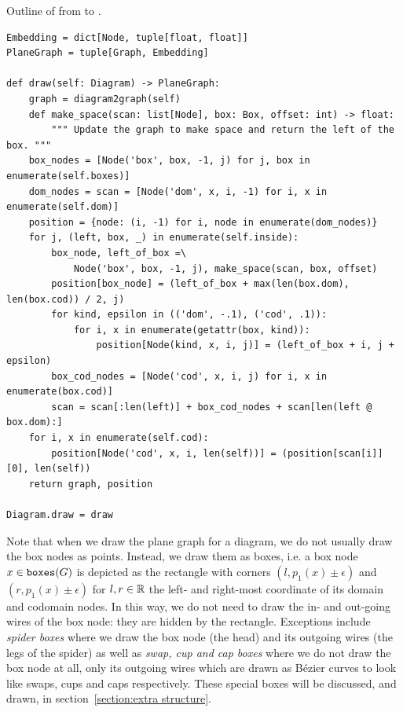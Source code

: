 \begin{python}
{\normalfont Outline of  from  to .}

\begin{verbatim}
Embedding = dict[Node, tuple[float, float]]
PlaneGraph = tuple[Graph, Embedding]

def draw(self: Diagram) -> PlaneGraph:
    graph = diagram2graph(self)
    def make_space(scan: list[Node], box: Box, offset: int) -> float:
        """ Update the graph to make space and return the left of the box. """
    box_nodes = [Node('box', box, -1, j) for j, box in enumerate(self.boxes)]
    dom_nodes = scan = [Node('dom', x, i, -1) for i, x in enumerate(self.dom)]
    position = {node: (i, -1) for i, node in enumerate(dom_nodes)}
    for j, (left, box, _) in enumerate(self.inside):
        box_node, left_of_box =\
            Node('box', box, -1, j), make_space(scan, box, offset)
        position[box_node] = (left_of_box + max(len(box.dom), len(box.cod)) / 2, j)
        for kind, epsilon in (('dom', -.1), ('cod', .1)):
            for i, x in enumerate(getattr(box, kind)):
                position[Node(kind, x, i, j)] = (left_of_box + i, j + epsilon)
        box_cod_nodes = [Node('cod', x, i, j) for i, x in enumerate(box.cod)]
        scan = scan[:len(left)] + box_cod_nodes + scan[len(left @ box.dom):]
    for i, x in enumerate(self.cod):
        position[Node('cod', x, i, len(self))] = (position[scan[i]][0], len(self))
    return graph, position

Diagram.draw = draw
\end{verbatim}
\end{python}

Note that when we draw the plane graph for a diagram, we do not usually draw the box nodes as points.
Instead, we draw them as boxes, i.e. a box node $x \in \mathtt{boxes}(G)$ is depicted as the rectangle with corners $(l, p_1(x) \pm \epsilon)$ and $(r, p_1(x) \pm \epsilon)$ for $l, r \in \mathbb{R}$ the left- and right-most coordinate of its domain and codomain nodes.
In this way, we do not need to draw the in- and out-going wires of the box node: they are hidden by the rectangle.
Exceptions include \emph{spider boxes} where we draw the box node (the head) and its outgoing wires (the legs of the spider) as well as \emph{swap, cup and cap boxes} where we do not draw the box node at all, only its outgoing wires which are drawn as Bézier curves to look like swaps, cups and caps respectively.
These special boxes will be discussed, and drawn, in section~\ref{section:extra structure}.

